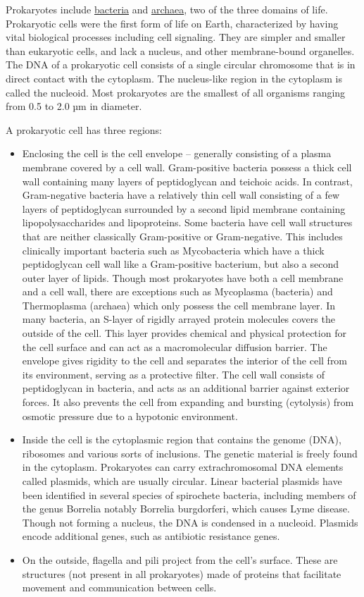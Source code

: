 Prokaryotes include \href{https://en.wikipedia.org/wiki/Bacteria}{bacteria} and \href{https://en.wikipedia.org/wiki/Archaea}{archaea}, two of the three domains of life. Prokaryotic cells were the first form of life on Earth, characterized by having vital biological processes including cell signaling. They are simpler and smaller than eukaryotic cells, and lack a nucleus, and other membrane-bound organelles. The DNA of a prokaryotic cell consists of a single circular chromosome that is in direct contact with the cytoplasm. The nucleus-like region in the cytoplasm is called the nucleoid. Most prokaryotes are the smallest of all organisms ranging from 0.5 to 2.0 µm in diameter.

A prokaryotic cell has three regions:

\begin{itemize}
\item
  Enclosing the cell is the cell envelope -- generally consisting of a plasma membrane covered by a cell wall. Gram-positive bacteria possess a thick cell wall containing many layers of peptidoglycan and teichoic acids. In contrast, Gram-negative bacteria have a relatively thin cell wall consisting of a few layers of peptidoglycan surrounded by a second lipid membrane containing lipopolysaccharides and lipoproteins. Some bacteria have cell wall structures that are neither classically Gram-positive or Gram-negative. This includes clinically important bacteria such as Mycobacteria which have a thick peptidoglycan cell wall like a Gram-positive bacterium, but also a second outer layer of lipids. Though most prokaryotes have both a cell membrane and a cell wall, there are exceptions such as Mycoplasma (bacteria) and Thermoplasma (archaea) which only possess the cell membrane layer. In many bacteria, an S-layer of rigidly arrayed protein molecules covers the outside of the cell. This layer provides chemical and physical protection for the cell surface and can act as a macromolecular diffusion barrier. The envelope gives rigidity to the cell and separates the interior of the cell from its environment, serving as a protective filter. The cell wall consists of peptidoglycan in bacteria, and acts as an additional barrier against exterior forces. It also prevents the cell from expanding and bursting (cytolysis) from osmotic pressure due to a hypotonic environment.
\item
  Inside the cell is the cytoplasmic region that contains the genome (DNA), ribosomes and various sorts of inclusions. The genetic material is freely found in the cytoplasm. Prokaryotes can carry extrachromosomal DNA elements called plasmids, which are usually circular. Linear bacterial plasmids have been identified in several species of spirochete bacteria, including members of the genus Borrelia notably Borrelia burgdorferi, which causes Lyme disease. Though not forming a nucleus, the DNA is condensed in a nucleoid. Plasmids encode additional genes, such as antibiotic resistance genes.
\item
  On the outside, flagella and pili project from the cell's surface. These are structures (not present in all prokaryotes) made of proteins that facilitate movement and communication between cells.
\end{itemize}

